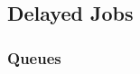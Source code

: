 \subsection{Delayed Jobs}
\label{section: Delayed Jobs}

\subsubsection{Queues}
\label{section: Queues}